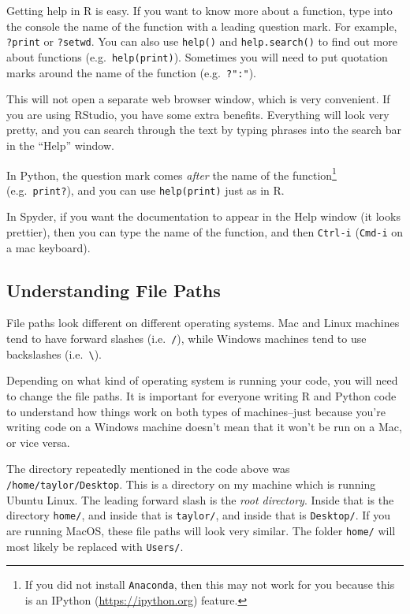 \documentclass[
  12pt,
  krantz2]{krantz}
\begin{document}
Getting help in R is easy. If you want to know more about a function, type into the console the name of the function with a leading question mark. For example, \texttt{?print} or \texttt{?setwd}. You can also use \texttt{help()} and \texttt{help.search()} to find out more about functions (e.g.~\texttt{help(print)}). Sometimes you will need to put quotation marks around the name of the function (e.g.~\texttt{?":"}).

This will not open a separate web browser window, which is very convenient. If you are using RStudio, you have some extra benefits. Everything will look very pretty, and you can search through the text by typing phrases into the search bar in the ``Help'' window.

In Python, the question mark comes \emph{after} the name of the function\footnote{If you did not install \texttt{Anaconda}, then this may not work for you because this is an IPython (\url{https://ipython.org}) feature.} (e.g.~\texttt{print?}), and you can use \texttt{help(print)} just as in R.

In Spyder, if you want the documentation to appear in the Help window (it looks prettier), then you can type the name of the function, and then \texttt{Ctrl-i} (\texttt{Cmd-i} on a mac keyboard).

\hypertarget{understanding-file-paths}{%
\subsection{Understanding File Paths}\label{understanding-file-paths}}

File paths look different on different operating systems. Mac and Linux machines tend to have forward slashes (i.e.~\texttt{/}), while Windows machines tend to use backslashes (i.e.~\texttt{\textbackslash{}}).

Depending on what kind of operating system is running your code, you will need to change the file paths. It is important for everyone writing R and Python code to understand how things work on both types of machines--just because you're writing code on a Windows machine doesn't mean that it won't be run on a Mac, or vice versa.

The directory repeatedly mentioned in the code above was \texttt{/home/taylor/Desktop}. This is a directory on my machine which is running Ubuntu Linux. The leading forward slash is the \emph{root directory}. Inside that is the directory \texttt{home/}, and inside that is \texttt{taylor/}, and inside that is \texttt{Desktop/}. If you are running MacOS, these file paths will look very similar. The folder \texttt{home/} will most likely be replaced with \texttt{Users/}.
\end{document}
